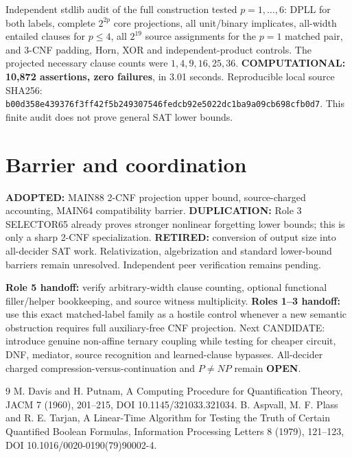 \documentclass[11pt]{article}
\begin{document}
Independent stdlib audit of the full construction tested $p=1,\ldots,6$: DPLL for both labels, complete $2^{2p}$ core projections, all unit/binary implicates, all-width entailed clauses for $p\le4$, all $2^{19}$ source assignments for the $p=1$ matched pair, and 3-CNF padding, Horn, XOR and independent-product controls. The projected necessary clause counts were $1,4,9,16,25,36$. \textbf{COMPUTATIONAL: 10,872 assertions, zero failures}, in 3.01 seconds. Reproducible local source SHA256:
\texttt{b00d358e439376f3ff42f5b249307546fedcb92e5022dc1ba9a09cb698cfb0d7}.
This finite audit does not prove general SAT lower bounds.

\section{Barrier and coordination}
\textbf{ADOPTED:} MAIN88 2-CNF projection upper bound, source-charged accounting, MAIN64 compatibility barrier. \textbf{DUPLICATION:} Role 3 SELECTOR65 already proves stronger nonlinear forgetting lower bounds; this is only a sharp 2-CNF specialization. \textbf{RETIRED:} conversion of output size into all-decider SAT work. Relativization, algebrization and standard lower-bound barriers remain unresolved. Independent peer verification remains pending.

\textbf{Role 5 handoff:} verify arbitrary-width clause counting, optional functional filler/helper bookkeeping, and source witness multiplicity. \textbf{Roles 1--3 handoff:} use this exact matched-label family as a hostile control whenever a new semantic obstruction requires full auxiliary-free CNF projection. Next CANDIDATE: introduce genuine non-affine ternary coupling while testing for cheaper circuit, DNF, mediator, source recognition and learned-clause bypasses. All-decider charged compression-versus-continuation and $P\ne NP$ remain \textbf{OPEN}.

\begin{thebibliography}{9}
 M. Davis and H. Putnam, A Computing Procedure for Quantification Theory, JACM 7 (1960), 201--215, DOI 10.1145/321033.321034.
 B. Aspvall, M. F. Plass and R. E. Tarjan, A Linear-Time Algorithm for Testing the Truth of Certain Quantified Boolean Formulas, Information Processing Letters 8 (1979), 121--123, DOI 10.1016/0020-0190(79)90002-4.
\end{thebibliography}
\end{document}
